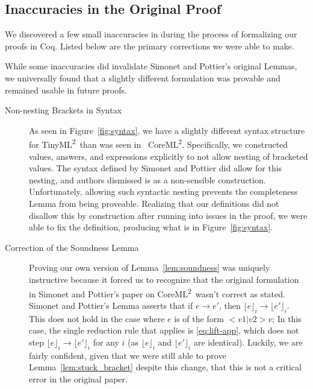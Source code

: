 \documentclass[a4paper,twocolumn]{article}
\newcommand{\langName}[0]{TinyML\textsuperscript{2}}
\newcommand{\origLang}[0]{CoreML\textsuperscript{2}}
\newcommand{\lift}[1]{\lfloor #1 \rfloor}
\theoremstyle{plain}
\theoremstyle{definition}
\begin{document}
\subsection{Inaccuracies in the Original Proof}

We discovered a few small inaccuracies in \cite{InfoFlowML} during the 
process of formalizing our proofs in Coq.  Listed below are the primary
corrections we were able to make.

While some inaccuracies did invalidate Simonet and Pottier's original
Lemmas, we universally found that a slightly different formulation was
provable and remained usable in future proofs.

\begin{description}
  \item[Non-nesting Brackets in Syntax]
    \hspace{0pt}
    
    As seen in Figure~\ref{fig:syntax}, we have a slightly different syntax
    structure for \langName ~than was seen in~ \origLang.  Specifically, we constructed
    values, answers, and expressions explicitly to not allow nesting of
    bracketed values.  The syntax defined by Simonet and Pottier did allow
    for this nesting, and authors dismissed is as a non-sensible
    construction.  Unfortunately, allowing such syntactic nesting 
    prevents the completeness Lemma from being proveable.
    Realizing that our definitions did not disallow
    this by construction after running into issues in the proof, we were able to
    fix the definition, producing what is in Figure~\ref{fig:syntax}.
    
  \item[Correction of the Soundness Lemma]
    \hspace{0pt}

    Proving our own version of Lemma~\ref{lem:soundness} was uniquely
    instructive because it forced us to recognize that the original
    formulation in Simonet and Pottier's paper on \origLang ~wasn't 
    correct as stated.  Simonet and Pottier's Lemma asserts that 
    if $e \rightarrow e'$, then $\lift{e}_i \rightarrow \lift{e'}_i$.
    This does not hold in the case where $e$ is of the form $<v1 | v2> v$;
    In this case, the single reduction rule that applies is \ref{eq:lift-app},
    which does not step $\lift{e}_i \rightarrow \lift{e'}_i$ for any $i$ 
    (as $\lift{e}_i$ and $\lift{e'}_i$ are identical).  Luckily, we are
    fairly confident, given that we were still able to prove
    Lemma~\ref{lem:stuck_bracket} despite this change, that this is not a
    critical error in the original paper.
\end{description}
\end{document}
